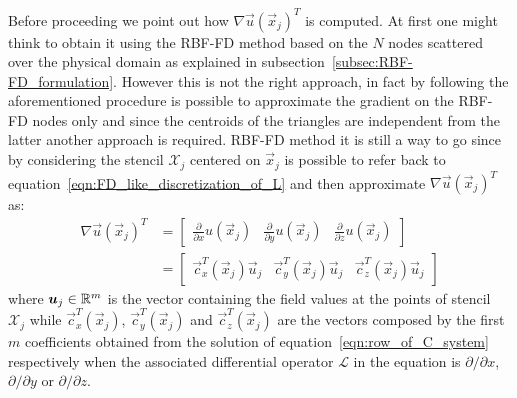 \smallskip
Before proceeding we point out how $\nabla \vec{u}(\vec{x}_j)^T$ is computed. At first one might think to obtain it using the RBF-FD method based on the $N$ nodes scattered over the physical domain as explained in subsection~\vref{subsec:RBF-FD_formulation}. However this is not the right approach, in fact by following the aforementioned procedure is possible to approximate the gradient on the RBF-FD nodes only and since the centroids of the triangles are independent from the latter another approach is required. RBF-FD method it is still a way to go since by considering the stencil $\mathcal{X}_j$ centered on $\vec{x}_j$ is possible to refer back to equation~\eqref{eqn:FD_like_discretization_of_L} and then approximate $\nabla \vec{u}(\vec{x}_j)^T$ as:
\begin{equation}
	\begin{split}
		\nabla \vec{u}(\vec{x}_j)^T & =
		\begin{bmatrix}
			\frac{\partial}{\partial x} u(\vec{x}_j)  &  \frac{\partial}{\partial y} u(\vec{x}_j)  &  \frac{\partial}{\partial z} u(\vec{x}_j)
		\end{bmatrix} \\
									& =
										\begin{bmatrix}
											\vec{c}_x^T(\vec{x}_j) \vec{u}_j  &  \vec{c}_y^T(\vec{x}_j) \vec{u}_j  &  \vec{c}_z^T(\vec{x}_j) \vec{u}_j
										\end{bmatrix}
	\end{split}
\end{equation}
where $\boldsymbol{u}_j \in \mathbb{R}^m$ is the vector containing the field values at the points of stencil $ \mathcal{X}_j$ while $\vec{c}_x^T(\vec{x}_j)$, $\vec{c}_y^T(\vec{x}_j)$ and $\vec{c}_z^T(\vec{x}_j)$ are the vectors composed by the first $m$ coefficients obtained from the solution of equation~\eqref{eqn:row_of_C_system} respectively when the associated differential operator $\mathcal{L}$ in the equation is $\partial / \partial x$, $\partial / \partial y$ or $\partial / \partial z$.

